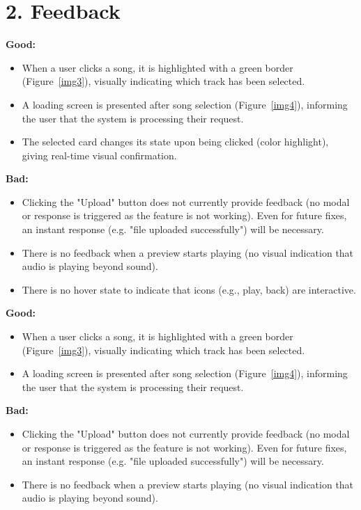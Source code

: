 \documentclass[12pt]{article}
\begin{document}
\section*{2. Feedback}

\textbf{Good:}
\begin{itemize}
    \item When a user clicks a song, it is highlighted with a green border (Figure~\ref{img3}), visually indicating which track has been selected.
    \item A loading screen is presented after song selection (Figure~\ref{img4}), informing the user that the system is processing their request.
    \item The selected card changes its state upon being clicked (color highlight), giving real-time visual confirmation.
\end{itemize}

\textbf{Bad:}
\begin{itemize}
    \item Clicking the "Upload" button does not currently provide feedback (no modal or response is triggered as the feature is not working). Even for future fixes, an instant response (e.g. "file uploaded successfully") will be necessary.
    \item There is no feedback when a preview starts playing (no visual indication that audio is playing beyond sound).
    \item There is no hover state to indicate that icons (e.g., play, back) are interactive.
\end{itemize}


\textbf{Good:}
\begin{itemize}
    \item When a user clicks a song, it is highlighted with a green border (Figure~\ref{img3}), visually indicating which track has been selected.
    \item A loading screen is presented after song selection (Figure~\ref{img4}), informing the user that the system is processing their request.
\end{itemize}

\textbf{Bad:}
\begin{itemize}
    \item Clicking the "Upload" button does not currently provide feedback (no modal or response is triggered as the feature is not working). Even for future fixes, an instant response (e.g. "file uploaded successfully") will be necessary.
    \item There is no feedback when a preview starts playing (no visual indication that audio is playing beyond sound).
\end{itemize}
\end{document}
